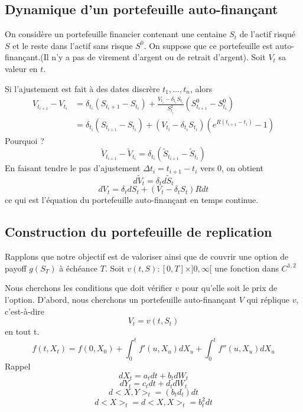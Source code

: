 \documentclass{article}
\theoremstyle{plain}
\theoremstyle{definition}
\begin{document}
\subsection{Dynamique d'un portefeuille auto-finan\c{c}ant}
On consid\`ere un portefeuille financier contenant une centaine $S_t$ de l'actif risqu\'e $S$ et le reste dans l'actif sans risque $S^0$.
On suppose que ce portefeuille est auto-finan\c{c}ant.(Il n'y a pas de virement d'argent ou de retrait d'argent). Soit $V_t$
 sa valeur en $t$.
 
Si l'ajustement est fait \`a des dates discr\`ere $t_1,\ldots,t_n$,  alors
\begin{equation}
\begin{split}
V_{t_{i+1}}-V_{t_i}&=\delta_{t_i}(S_{t_i+1}-S_{t_i})+\frac{V_{t_i}-\delta_{t_i}S_{t_i}}{S^2_{t_i}}(S^0_{t_{i+1}}-S^0_{t_{i}})\\
&=\delta_{t_i}(S_{t_{i+1}}-S_{t_i})+(V_{t_i}-\delta_{t_i}S_{t_i})(e^{R(t_{i+1}-t_i)}-1)
\end{split}
\end{equation}
{\color{red} Pourquoi ?}
\begin{equation}
\tilde{V}_{t_{i+1}}-\tilde{V}_{t_i}=\delta_{t_i}(\tilde{S}_{t_{i+1}}-\tilde{S}_{t_i})
\end{equation}
En faisant tendre le pas d'ajustement $\Delta t_i=t_{i+1}-t_i$ vers $0$, on obtient
\begin{equation}
d\tilde{V}_t=\delta_td\tilde{S}_t
\end{equation}
\begin{equation}
dV_t=\delta_tdS_t+(V_t-\delta_t S_t)Rdt
\end{equation}
ce qui est l'\'equation du portefeuille auto-finan\c{c}ant en temps continue. 

\subsection{Construction du portefeuille de replication}

Rapplons que notre objectif est de valoriser ainsi que de couvrir une option de payoff $g(S_T)$ \`a \'ech\'eance $T$.
Soit $v(t,S):[0,T]\times]0,\infty[ $ une fonction dans $C^{1,2}$ 
 
Nous cherchons les conditions que doit v\'erifier $v$ pour qu'elle soit le prix de l'option.
D'abord, nous cherchons un portefeuille auto-finan\c{c}ant $V$ qui r\'eplique $v$, c'est-\`a-dire
\begin{equation}
V_t=v(t,S_t)
\end{equation}
en tout t.
\begin{equation}
f(t,X_t)=f(0,X_0)+\int_0^tf'(u,X_u)dX_u+\int_0^tf''(u,X_u)dX_u
\end{equation}
Rappel
\begin{equation}
dX_t=a_tdt+b_tdW_t
\end{equation}
\begin{equation}
dY_t=c_tdt+d_tdW_t
\end{equation}
\begin{equation}
d<X,Y>_t=(b_td_t)dt
\end{equation}
\begin{equation}
d<X>_t=d<X,X>_t=b_t^2dt
\end{equation}
\end{document}
